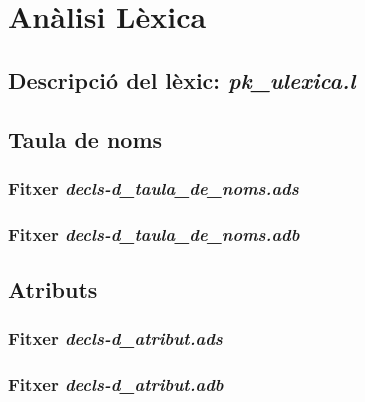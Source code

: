 \section{Anàlisi Lèxica}

\subsection{Descripció del lèxic: \emph{pk\_ulexica.l}}

\newpage

\subsection{Taula de noms}
\subsubsection{Fitxer \emph{decls-d\_taula\_de\_noms.ads}}

\newpage

\subsubsection{Fitxer \emph{decls-d\_taula\_de\_noms.adb}}

\newpage

\subsection{Atributs}
\subsubsection{Fitxer \emph{decls-d\_atribut.ads}}

\newpage

\subsubsection{Fitxer \emph{decls-d\_atribut.adb}}

\newpage
